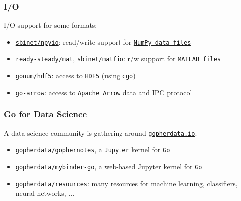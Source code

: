 \documentclass[9pt]{beamer}
\newcommand{\myblue} [1] {{\color{blue}#1}}
\begin{document}
\begin{frame}[fragile]
\frametitle{I/O}


I/O support for some formats:


\begin{itemize}
\item \myblue{\href{https://github.com/sbinet/npyio}{\texttt{sbinet/npyio}}}: read/write support for \myblue{\href{http://docs.scipy.org/doc/numpy/neps/npy-format.html}{\texttt{NumPy data files}}}
\item \myblue{\href{https://github.com/ready-steady/mat}{\texttt{ready-steady/mat}}}, \myblue{\href{https://github.com/sbinet/matfio}{\texttt{sbinet/matfio}}}: r/w support for \myblue{\href{http://www.mathworks.com/help/pdf\_doc/matlab/apiext.pdf}{\texttt{MATLAB files}}}
\item \myblue{\href{https://github.com/gonum/hdf5}{\texttt{gonum/hdf5}}}: access to \myblue{\href{https://www.hdfgroup.org/HDF5}{\texttt{HDF5}}} (using \texttt{cgo})
\item \myblue{\href{https://godoc.org/github.com/apache/arrow/go/arrow}{\texttt{go-arrow}}}: access to \myblue{\href{https://arrow.apache.org}{\texttt{Apache Arrow}}} data and IPC protocol
\end{itemize}


\end{frame}

\begin{frame}[fragile]
\frametitle{Go for Data Science}


A data science community is gathering around \myblue{\href{https://gopherdata.io}{\texttt{gopherdata.io}}}.


\begin{itemize}
\item \myblue{\href{https://github.com/gopherdata/gophernotes}{\texttt{gopherdata/gophernotes}}}, a \myblue{\href{http://jupyter.org}{\texttt{Jupyter}}} kernel for \myblue{\href{https://golang.org}{\texttt{Go}}}
\item \myblue{\href{https://github.com/gopherdata/mybinder-go}{\texttt{gopherdata/mybinder-go}}}, a web-based Jupyter kernel for \myblue{\href{https://golang.org}{\texttt{Go}}}
\item \myblue{\href{https://github.com/gopherdata/resources/tree/master/tooling}{\texttt{gopherdata/resources}}}: many resources for machine learning, classifiers, neural networks, ...
\end{itemize}


\end{frame}
\end{document}
